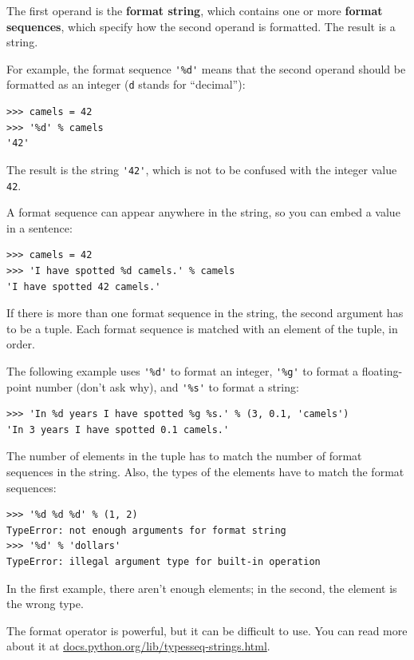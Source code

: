 \documentclass[10pt]{book}
\begin{document}

The first operand is the {\bf format string}, which contains
one or more {\bf format sequences}, which
specify how
the second operand is formatted.  The result is a string.


For example, the format sequence \verb"'%d'" means that
the second operand should be formatted as an
integer ({\tt d} stands for ``decimal''):

\beforeverb
\begin{verbatim}
>>> camels = 42
>>> '%d' % camels
'42'
\end{verbatim}
\afterverb
%
The result is the string \verb"'42'", which is not to be confused
with the integer value {\tt 42}.

A format sequence can appear anywhere in the string,
so you can embed a value in a sentence:

\beforeverb
\begin{verbatim}
>>> camels = 42
>>> 'I have spotted %d camels.' % camels
'I have spotted 42 camels.'
\end{verbatim}
\afterverb
%
If there is more than one format sequence in the string,
the second argument has to be a tuple.  Each format sequence is
matched with an element of the tuple, in order.

The following example uses \verb"'%d'" to format an integer,
\verb"'%g'" to format
a floating-point number (don't ask why), and \verb"'%s'" to format
a string:

\beforeverb
\begin{verbatim}
>>> 'In %d years I have spotted %g %s.' % (3, 0.1, 'camels')
'In 3 years I have spotted 0.1 camels.'
\end{verbatim}
\afterverb
%
The number of elements in the tuple has to match the number
of format sequences in the string.  Also, the types of the
elements have to match the format sequences:


\beforeverb
\begin{verbatim}
>>> '%d %d %d' % (1, 2)
TypeError: not enough arguments for format string
>>> '%d' % 'dollars'
TypeError: illegal argument type for built-in operation
\end{verbatim}
\afterverb
%
In the first example, there aren't enough elements; in the
second, the element is the wrong type.

The format operator is powerful, but it can be difficult to use.  You
can read more about it at
\url{docs.python.org/lib/typesseq-strings.html}.
\end{document}
